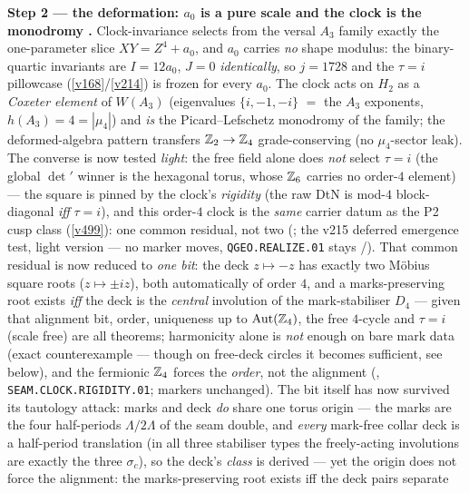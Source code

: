 \par\smallskip\noindent\textbf{Step 2 --- the deformation: $a_0$ is a pure scale and the clock is the
monodromy \mE.} Clock-invariance selects from the
versal $A_3$ family exactly the one-parameter slice $XY=Z^4{+}a_0$, and $a_0$ carries \emph{no} shape
modulus: the binary-quartic invariants are $I=12a_0$, $J=0$ \emph{identically}, so $j=1728$ and the
$\tau{=}i$ pillowcase (\vref{v168}/\vref{v214}) is frozen for every $a_0$. The clock acts on $H_2$ as a
\emph{Coxeter element} of $W(A_3)$ (eigenvalues $\{i,-1,-i\}$ $=$ the $A_3$ exponents,
$h(A_3){=}4{=}|\mu_4|$) and \emph{is} the Picard--Lefschetz monodromy of the family; the deformed-algebra
pattern transfers $\mathbb{Z}_2\to\mathbb{Z}_4$ grade-conserving (no $\mu_4$-sector leak).
 The converse is now tested \emph{light}: the free
field alone does \emph{not} select $\tau=i$ (the global $\det{}'$ winner is the hexagonal torus, whose
$\mathbb{Z}_6$ carries no order-$4$ element) --- the square is pinned by the clock's \emph{rigidity} (the raw
DtN is mod-$4$ block-diagonal \emph{iff} $\tau=i$), and this order-$4$ clock is the \emph{same} carrier
datum as the P2 cusp class (\vref{v499}): one common residual, not two
(; the v215 deferred emergence test, light version --- no marker
moves, \texttt{QGEO.REALIZE.01} stays \mC/\mO). That common residual is now reduced to \emph{one bit}:
the deck $z\mapsto-z$ has exactly two M\"obius square roots ($z\mapsto\pm iz$), both automatically of
order $4$, and a marks-preserving root exists \emph{iff} the deck is the \emph{central} involution of
the mark-stabiliser $D_4$ --- given that alignment bit, order, uniqueness up to $\operatorname{Aut}(\mathbb{Z}_4)$,
the free $4$-cycle and $\tau=i$ (scale free) are all theorems; harmonicity alone is \emph{not} enough
on bare mark data (exact counterexample --- though on free-deck circles it becomes sufficient, see
below), and the fermionic $\mathbb{Z}_4$ forces the \emph{order}, not the alignment
(, \texttt{SEAM.CLOCK.RIGIDITY.01}; markers unchanged). The bit
itself has now survived its tautology attack: marks and deck \emph{do} share one torus origin ---
the marks are the four half-periods $\Lambda/2\Lambda$ of the seam double, and \emph{every}
mark-free collar deck is a half-period translation (in all three stabiliser types the freely-acting
involutions are exactly the three $\sigma_c$), so the deck's \emph{class} is derived --- yet the
origin does not force the alignment: the marks-preserving root exists iff the deck pairs separate
